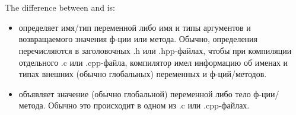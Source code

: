 \section{}

{The difference between  and  is}:

\begin{itemize}
\item
{} определяет имя/тип переменной либо имя и типы аргументов и возвращаемого значения ф-ции
или метода.
Обычно, определения перечисляются в заголовочных .h или .hpp-файлах, чтобы при компиляции отдельного
.c или .cpp-файла, компилятор имел информацию об именах и типах внешних (обычно глобальных) переменных и ф-ций/методов.

\item
{} объявляет значение (обычно глобальной) переменной либо тело ф-ции/метода.
Обычно это происходит в одном из .c или .cpp-файлах.
\end{itemize}




